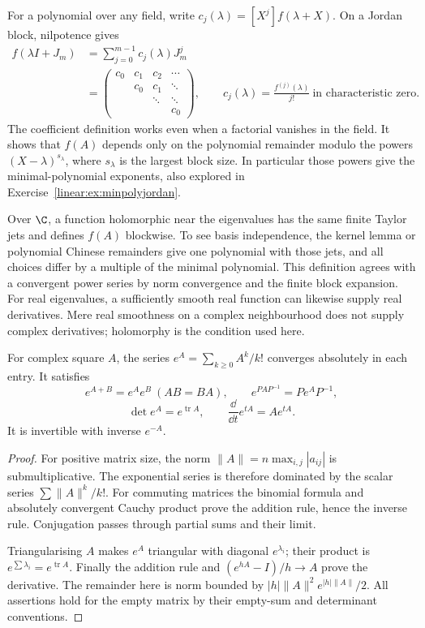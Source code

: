 For a polynomial over any field, write $c_j(\lambda)=[X^j]f(\lambda+X)$. On a Jordan block, nilpotence gives
\begin{equation}\label{linear:eq:fjordan}
\begin{aligned}
f(\lambda I+J_m)&=\sum_{j=0}^{m-1}c_j(\lambda)J_m^j\\
&=\begin{pmatrix}c_0&c_1&c_2&\cdots\\&c_0&c_1&\ddots\\&&\ddots&\ddots\\&&&c_0\end{pmatrix},\qquad
c_j(\lambda)=\frac{f^{(j)}(\lambda)}{j!}\ \text{in characteristic zero}.
\end{aligned}
\end{equation}
The coefficient definition works even when a factorial vanishes in the field. It shows that $f(A)$ depends only on the polynomial remainder modulo the powers $(X-\lambda)^{s_\lambda}$, where $s_\lambda$ is the largest block size. In particular those powers give the minimal-polynomial exponents, also explored in Exercise~\ref{linear:ex:minpolyjordan}.

Over $\C$, a function holomorphic near the eigenvalues has the same finite Taylor jets and defines $f(A)$ blockwise. To see basis independence, the kernel lemma or polynomial Chinese remainders give one polynomial with those jets, and all choices differ by a multiple of the minimal polynomial. This definition agrees with a convergent power series by norm convergence and the finite block expansion. For real eigenvalues, a sufficiently smooth real function can likewise supply real derivatives. Mere real smoothness on a complex neighbourhood does not supply complex derivatives; holomorphy is the condition used here.

\begin{proposition}\label{linear:prop:exp}
For complex square $A$, the series $e^A=\sum_{k\ge0}A^k/k!$ converges absolutely in each entry. It satisfies
\[e^{A+B}=e^Ae^B\ (AB=BA),\qquad e^{PAP^{-1}}=Pe^AP^{-1},\]
\[\det e^A=e^{\operatorname{tr}A},\qquad\frac{\dd}{\dd t}e^{tA}=Ae^{tA}.
\]
It is invertible with inverse $e^{-A}$.
\end{proposition}
\begin{proof}
For positive matrix size, the norm $\|A\|=n\max_{i,j}|a_{ij}|$ is submultiplicative. The exponential series is therefore dominated by the scalar series $\sum\|A\|^k/k!$. For commuting matrices the binomial formula and absolutely convergent Cauchy product prove the addition rule, hence the inverse rule. Conjugation passes through partial sums and their limit.

Triangularising $A$ makes $e^A$ triangular with diagonal $e^{\lambda_i}$; their product is $e^{\sum\lambda_i}=e^{\operatorname{tr}A}$. Finally the addition rule and $(e^{hA}-I)/h\to A$ prove the derivative. The remainder here is norm bounded by $|h|\|A\|^2e^{|h|\|A\|}/2$. All assertions hold for the empty matrix by their empty-sum and determinant conventions.
\end{proof}

